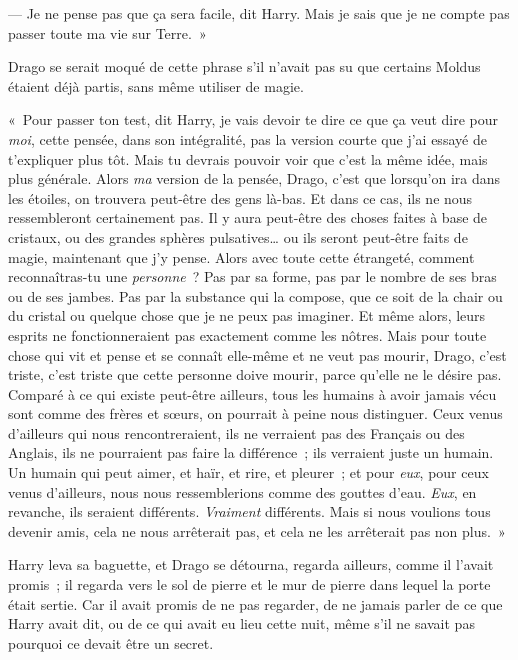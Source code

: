 --- Je ne pense pas que ça sera facile, dit Harry. Mais je sais que je ne compte pas passer toute ma vie sur Terre.~»

Drago se serait moqué de cette phrase s'il n'avait pas su que certains Moldus étaient déjà partis, sans même utiliser de magie.

«~Pour passer ton test, dit Harry, je vais devoir te dire ce que ça veut dire pour \emph{moi}, cette pensée, dans son intégralité, pas la version courte que j'ai essayé de t'expliquer plus tôt. Mais tu devrais pouvoir voir que c'est la même idée, mais plus générale. Alors \emph{ma} version de la pensée, Drago, c'est que lorsqu'on ira dans les étoiles, on trouvera peut-être des gens là-bas. Et dans ce cas, ils ne nous ressembleront certainement pas. Il y aura peut-être des choses faites à base de cristaux, ou des grandes sphères pulsatives… ou ils seront peut-être faits de magie, maintenant que j'y pense. Alors avec toute cette étrangeté, comment reconnaîtras-tu une \emph{personne}~? Pas par sa forme, pas par le nombre de ses bras ou de ses jambes. Pas par la substance qui la compose, que ce soit de la chair ou du cristal ou quelque chose que je ne peux pas imaginer. Et même alors, leurs esprits ne fonctionneraient pas exactement comme les nôtres. Mais pour toute chose qui vit et pense et se connaît elle-même et ne veut pas mourir, Drago, c'est triste, c'est triste que cette personne doive mourir, parce qu'elle ne le désire pas. Comparé à ce qui existe peut-être ailleurs, tous les humains à avoir jamais vécu sont comme des frères et sœurs, on pourrait à peine nous distinguer. Ceux venus d'ailleurs qui nous rencontreraient, ils ne verraient pas des Français ou des Anglais, ils ne pourraient pas faire la différence~; ils verraient juste un humain. Un humain qui peut aimer, et haïr, et rire, et pleurer~; et pour \emph{eux}, pour ceux venus d'ailleurs, nous nous ressemblerions comme des gouttes d'eau. \emph{Eux}, en revanche, ils seraient différents. \emph{Vraiment} différents. Mais si nous voulions tous devenir amis, cela ne nous arrêterait pas, et cela ne les arrêterait pas non plus.~»

Harry leva sa baguette, et Drago se détourna, regarda ailleurs, comme il l'avait promis~; il regarda vers le sol de pierre et le mur de pierre dans lequel la porte était sertie. Car il avait promis de ne pas regarder, de ne jamais parler de ce que Harry avait dit, ou de ce qui avait eu lieu cette nuit, même s'il ne savait pas pourquoi ce devait être un secret.

